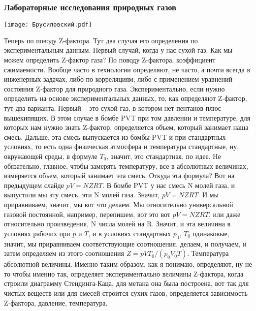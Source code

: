 \documentclass[main.tex]{subfiles}
\begin{document}
\subsubsection{Лабораторные исследования природных газов}

\begin{center}
\texttt{[image: Брусиловский.pdf]}
\end{center}

Теперь по поводу Z-фактора.
Тут два случая его определения по экспериментальным данным.
Первый случай, когда у нас сухой газ.
Как мы можем определить Z-фактор газа?
По поводу Z-фактора, коэффициент сжимаемости.
Вообще часто в технологии определяют, не часто, а почти всегда в инженерных задачах, либо по корреляциям, либо с применением уравнений состояния Z-фактор для природного газа.
Экспериментально, если нужно определить на основе экспериментальных данных, то, как определяют Z-фактор, тут два варианта.
Первый -- это сухой газ, в котором нет пентанов плюс вышекипящих.
В этом случае в бомбе PVT при том давлении и температуре, для которых нам нужно знать Z-фактор, определяется объем, который занимает наша смесь.
Дальше, эта смесь выпускается из бомбы PVT и при стандартных условиях, то есть одна физическая атмосфера и температура стандартные, ну, окружающей среды, в формуле $T_0$, значит, это стандартная, по идее.
Не обязательно, главное, чтобы замерять температуру, все в абсолютных величинах, измеряется объем, который занимает эта смесь.
Откуда эта формула?
Вот на предыдущем слайде $pV=NZRT$.
В бомбе PVT у нас смесь N молей газа, и выпустили мы эту смесь, эти N молей газа.
Значит, $pV=NZRT$.
И мы приравниваем, значит, мы вот что делаем.
Мы относительно универсальной газовой постоянной, например, перепишем, вот это вот $pV=NZRT$, или даже относительно произведения, N числа молей на R.
Значит, и эта величина в условиях рабочих при $p$ и $T$, и в условиях стандартных $p_0$, $T_0$ одинаковые, значит, мы приравниваем соответствующие соотношения, делаем, и получаем, и затем определяем из этого соотношения $Z=pVT_0/(p_0V_0T)$.
Температура абсолютной величины.
Именно таким образом, как я понимаю, определяют, ну не то чтобы именно так, определяет экспериментально величины Z-фактора, когда строили диаграмму Стендинга-Каца, для метана она была построена, вот так для чистых веществ или для смесей строится сухих газов, определяется зависимость Z-фактора, давление, температура.
\end{document}
